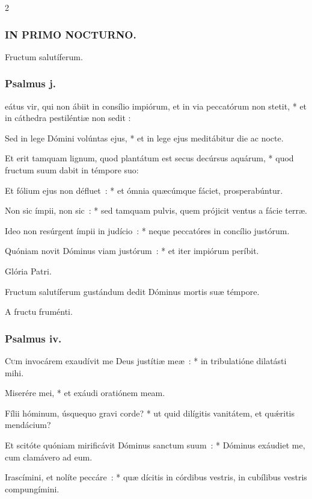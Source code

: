 \documentclass[9pt,twoside]{extarticle}
\begin{document}
\begin{multicols}{2}
{\subsubsection*{\center \textsc{IN PRIMO NOCTURNO.}}
 Fructum salutíferum.
\subsubsection*{\center Psalmus j.}
eátus vir, qui non ábiit in consílio impiórum, et in via peccatórum non stetit, * et in cáthedra pestiléntiæ non sedit :

Sed in lege Dómini volúntas ejus, * et in lege ejus meditábitur die ac nocte.

Et erit tamquam lignum, quod plantátum est secus decúrsus aquárum, * quod fructum suum dabit in témpore suo:

Et fólium ejus non défluet~: * et ómnia quæcúmque fáciet, prosperabúntur.

Non sic ímpii, non sic~: * sed tamquam pulvis, quem prójicit ventus a fácie terræ.

Ideo non resúrgent ímpii in judício~: * neque peccatóres in concílio justórum.

Quóniam novit Dóminus viam justórum~: * et iter impiórum períbit.

Glória Patri.

\begin{tightlist}{}
\item {} Fructum salutíferum gustándum dedit Dóminus mortis suæ témpore.
\item {} A fructu fruménti.
\end{tightlist}

\subsubsection*{\center Psalmus iv.}
\lettrine{C}um invocárem exaudívit me Deus justítiæ meæ~: * in tribulatióne dilatásti mihi.

Miserére mei, * et exáudi oratiónem meam.

Fílii hóminum, úsquequo gravi corde? * ut quid dilígitis vanitátem, et quǽritis mendácium?

Et scitóte quóniam mirificávit Dóminus sanctum suum~: * Dóminus exáudiet me, cum clamávero ad eum.

Irascímini, et nolíte peccáre~: * quæ dícitis in córdibus vestris, in cubílibus vestris compungímini.

}
\end{multicols}
\end{document}

